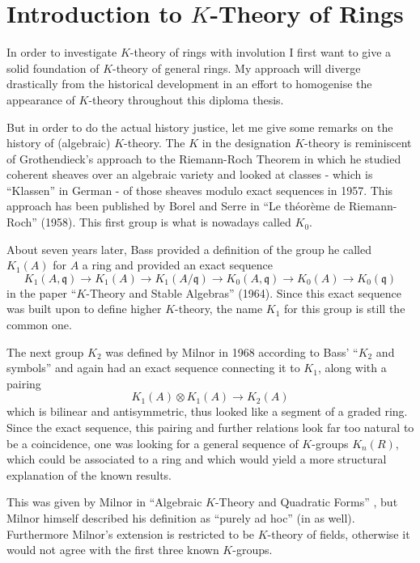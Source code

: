 \chapter{Introduction to $K$-Theory of Rings}
In order to investigate $K$-theory of rings with involution I first want to give a solid foundation of
$K$-theory of general rings. My approach will diverge drastically from the historical development in an effort
to homogenise the appearance of $K$-theory throughout this diploma thesis.

But in order to do the actual history justice, let me give some remarks on the history of (algebraic) $K$-theory. The $K$ in the designation $K$-theory is
reminiscent of Grothendieck's approach to the Riemann-Roch Theorem in which he studied coherent sheaves over an algebraic variety and looked
at classes - which is ``Klassen'' in German - of those sheaves modulo exact sequences in 1957. This approach has been published by Borel and Serre
in ``Le th\'eor\`eme de Riemann-Roch'' \cite{borelserre1958} (1958). This first group is what is nowadays called $K_0$.

About seven years later, Bass provided a definition of the group he called $K_1(A)$ for $A$ a ring and provided an exact sequence
$$K_1(A,\mathfrak{q})\rightarrow K_1(A) \rightarrow K_1(A/\mathfrak{q}) \rightarrow K_0(A,\mathfrak{q})\rightarrow K_0(A)\rightarrow K_0(\mathfrak{q})$$
in the paper ``$K$-Theory and Stable Algebras'' \cite{bass1964k} (1964). Since this exact sequence was built upon to define higher $K$-theory,
the name $K_1$ for this group is still the common one.

The next group $K_2$ was defined by Milnor in 1968 according to Bass' ``$K_2$ and symbols'' \cite{bass1969k} and again had an exact sequence connecting
it to $K_1$, along with a pairing $$K_1(A)\otimes K_1(A) \rightarrow K_2(A)$$ which is bilinear and antisymmetric, thus looked like a segment of a graded ring.
Since the exact sequence, this pairing and further relations look far too natural to be a coincidence, one was looking for a general sequence of $K$-groups $K_n(R)$,
which could be associated to a ring and which would yield a more structural explanation of the known results.

This was given by Milnor in ``Algebraic $K$-Theory and Quadratic Forms'' \cite{milnor1970algebraick}, but Milnor himself described
his definition as ``purely ad hoc'' (in \cite{milnor1970algebraick} as well). Furthermore Milnor's extension is restricted to be $K$-theory of fields, otherwise it would
not agree with the first three known $K$-groups.

